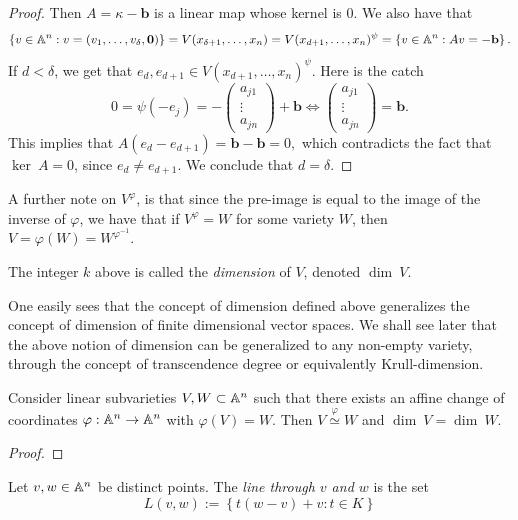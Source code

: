 \begin{proof}
    Then $A = \kappa-\mathbf{b}$ is a linear map whose kernel is $0$. We also have that 
    $$\{v\in\mathbb{A}^n : v= (v_1,\dots,v_\delta,\mathbf{0})\}=V(x_{\delta+1},\dots,x_{n})=V(x_{d+1},\dots,x_n)^\psi = \left\{v\in \mathbb{A}^n : Av=-\mathbf{b}\right\}.$$
    If $d<\delta$, we get that $e_d, e_{d+1} \in V(x_{d+1},\dots,x_n)^\psi$. Here is the catch 
    $$0=\psi(-e_j) = -\begin{pmatrix}
     a_{j1}\\ \vdots \\ a_{j n}   
    \end{pmatrix} + \mathbf{b} \iff \begin{pmatrix}
     a_{j1}\\ \vdots \\ a_{j n}   
    \end{pmatrix}= \mathbf{b}.$$
    This implies that $A(e_d-e_{d+1}) = \mathbf{b}-\mathbf{b}=0,$
    which contradicts the fact that $\ker\ A = 0$, since $e_d\neq e_{d+1}$. We conclude that $d=\delta$.
\end{proof}
\begin{remark}\label{MayConsiderPreimageAsImage}
    A further note on $V^\varphi$, is that since the pre-image is equal to the image of the inverse of $\varphi$, we have that if $V^\varphi = W$ for some variety $W$, then $V = \varphi(W) = W^{\varphi^{-1}}$. 
\end{remark}
\begin{definition}\label{LinearSubvarDimension}
    The integer $k$ above is called the \textit{dimension} of $V$, denoted $\dim\ V$. 
\end{definition}
\begin{remark}
    One easily sees that the concept of dimension defined above generalizes the concept of dimension of finite dimensional vector spaces. We shall see later that the above notion of dimension can be generalized to any non-empty variety, through the concept of transcendence degree or equivalently Krull-dimension. 
\end{remark}
\begin{lemma}
    Consider linear subvarieties $V,W\subset \mathbb{A}^n$ such that there exists an affine change of coordinates $\varphi: \mathbb{A}^n \rightarrow \mathbb{A}^n$ with $\varphi(V)=W$. Then $V\overset{\varphi}{\simeq} W$ and $\dim\ V=\dim\ W$.
\end{lemma}
\begin{proof}
    
\end{proof}
\begin{definition}
    Let $v,w\in\mathbb{A}^n$ be distinct points. The \textit{line through $v$ and $w$} is the set 
    $$L(v,w):=\left\{t(w-v)+v : t \in K \right\} $$
\end{definition}
